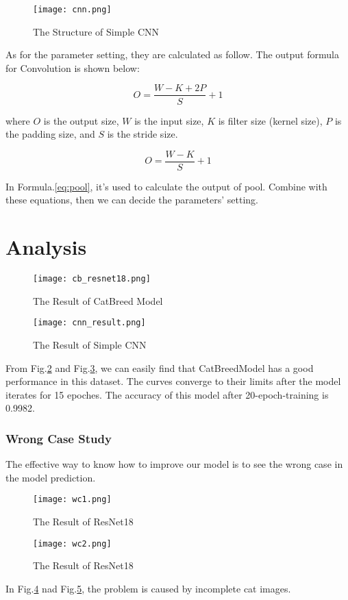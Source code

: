 \documentclass[12pt]{article}
\begin{document}
\begin{figure}[h]
    \centering
    \texttt{[image: cnn.png]}
    \caption{The Structure of Simple CNN}
    \label{fig:cnn}
\end{figure}

As for the parameter setting, they are calculated as follow. 
The output formula for Convolution is shown below:

\begin{equation}
O=\frac{W-K+2 P}{S}+1\label{eq:conv}
\end{equation}

where $O$ is the output size, $W$ is the input size, 
$K$ is filter size (kernel size), $P$ is the padding size,
and $S$ is the stride size.

\begin{equation}
O=\frac{W-K}{S}+1\label{eq:pool}
\end{equation}

In Formula.\ref{eq:pool}, it's used to calculate the output of pool.
Combine with these equations, then we can decide the parameters' setting.

\section{Analysis}

\begin{figure}[h]
    \centering
    \texttt{[image: cb\_resnet18.png]}
    \caption{The Result of CatBreed Model}
    \label{fig:resnet}
\end{figure}

\begin{figure}[h]
    \centering
    \texttt{[image: cnn\_result.png]}
    \caption{The Result of Simple CNN}
    \label{fig:cnn_result}
\end{figure}

From Fig.\ref{fig:resnet} and Fig.\ref{fig:cnn_result}, we can easily
find that CatBreedModel has a good performance in this dataset. 
The curves converge to their limits after the model iterates for 15 epoches.
The accuracy of this model after 20-epoch-training is 0.9982.

\subsubsection*{Wrong Case Study}
The effective way to know how to improve our model is to see the wrong case in 
the model prediction.
\begin{figure}[h]
    \centering
    \texttt{[image: wc1.png]}
    \caption{The Result of ResNet18}
    \label{fig:wc1}
\end{figure}
\begin{figure}[h]
    \centering
    \texttt{[image: wc2.png]}
    \caption{The Result of ResNet18}
    \label{fig:wc2}
\end{figure}
In Fig.\ref{fig:wc1} nad Fig.\ref{fig:wc2}, the problem is caused by 
incomplete cat images. 
\end{document}
